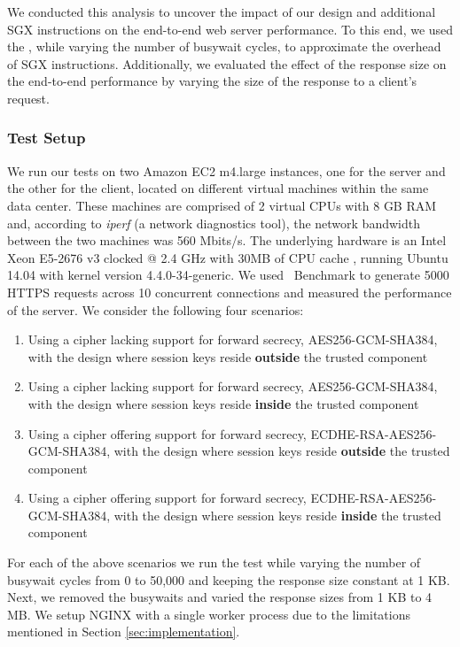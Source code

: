 \documentclass[../../../main.tex]{subfiles}
\begin{document}
\label{sec:endtoend}
We conducted this analysis to uncover the impact of our design and
additional SGX instructions on the end-to-end web server performance.
To this end, we used the \enclavemodel, while varying the
number of busywait cycles, to approximate the overhead of SGX
instructions. Additionally, we evaluated the effect of the response
size on the end-to-end performance by varying the size of the response
to a client's request.

\subsubsection*{Test Setup}
We run our tests on two Amazon EC2 m4.large instances, one for the
server and the other for the client, located on different virtual
machines within the same data center. These machines are comprised of
2 virtual CPUs with 8 GB RAM and, according to \textit{iperf} (a
network diagnostics tool), the network bandwidth between the two
machines was 560 Mbits/s. The underlying hardware is an Intel Xeon
E5-2676 v3 clocked @ 2.4 GHz with 30MB of CPU cache
\cite{aws_instances}, running Ubuntu 14.04 with kernel version
4.4.0-34-generic. We used \Apache~Benchmark to generate 5000 HTTPS
requests across 10 concurrent connections and measured the performance
of the server. We consider the following four scenarios:
\begin{enumerate}
  \item Using a cipher lacking support for forward secrecy, AES256-GCM-SHA384,
    with the design where session keys reside \textbf{outside} the trusted
    component
  \item Using a cipher lacking support for forward secrecy, AES256-GCM-SHA384,
    with the design where session keys reside \textbf{inside} the trusted
    component
  \item Using a cipher offering support for forward secrecy,
    ECDHE-RSA-AES256-GCM-SHA384, with the design where session keys reside
    \textbf{outside} the trusted component
  \item Using a cipher offering support for forward secrecy,
    ECDHE-RSA-AES256-GCM-SHA384, with the design where session keys reside
    \textbf{inside} the trusted component
\end{enumerate}

For each of the above scenarios we run the test while varying the
number of busywait cycles from 0 to 50,000 and keeping the response
size constant at 1 KB. Next, we removed the busywaits and varied the
response sizes from 1 KB to 4 MB. We setup NGINX with a single worker
process due to the limitations mentioned in Section
\ref{sec:implementation}.
\end{document}
